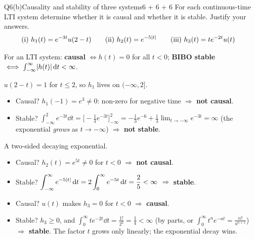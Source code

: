 \begin{qcard}{Q6(b)}{Causality and stability of three systems}{6 + 6 + 6}
For each continuous-time LTI system determine whether it is causal and whether it is stable. Justify your answers.
\[\text{(i) } h_1(t)=e^{-3t}u(2-t)\qquad\text{(ii) } h_2(t)=e^{-5\lvert t\rvert}\qquad\text{(iii) } h_3(t)=te^{-2t}u(t)\]
\end{qcard}
\begin{solution}
\begin{keyidea}For an LTI system: \textbf{causal} $\iff h(t)=0$ for all $t<0$; \textbf{BIBO stable} $\iff\int_{-\infty}^{\infty}\lvert h(t)\rvert\,\mathrm{d} t<\infty$.\end{keyidea}

 $u(2-t)=1$ for $t\le2$, so $h_1$ lives on $(-\infty,2]$.
\begin{itemize}[leftmargin=1.4em,itemsep=2pt]
\item Causal? $h_1(-1)=e^{3}\ne0$: non-zero for negative time $\Rightarrow$ \textbf{not causal}.
\item Stable? $\displaystyle\int_{-\infty}^{2}e^{-3t}\dd t=\Big[-\tfrac13e^{-3t}\Big]_{-\infty}^{2}=-\tfrac13e^{-6}+\tfrac13\lim_{t\to-\infty}e^{-3t}=\infty$ (the exponential \emph{grows} as $t\to-\infty$) $\Rightarrow$ \textbf{not stable}.
\end{itemize}
 A two-sided decaying exponential.
\begin{itemize}[leftmargin=1.4em,itemsep=2pt]
\item Causal? $h_2(t)=e^{5t}\ne0$ for $t<0$ $\Rightarrow$ \textbf{not causal}.
\item Stable? $\displaystyle\int_{-\infty}^\infty e^{-5\lvert t\rvert}\,\mathrm{d} t=2\int_0^\infty e^{-5t}\,\mathrm{d} t=\frac25<\infty$ $\Rightarrow$ \textbf{stable}.
\end{itemize}
\begin{itemize}[leftmargin=1.4em,itemsep=2pt]
\item Causal? $u(t)$ makes $h_3=0$ for $t<0$ $\Rightarrow$ \textbf{causal}.
\item Stable? $h_3\ge0$, and $\displaystyle\int_0^\infty te^{-2t}\dd t=\frac{1!}{2^2}=\frac14<\infty$ (by parts, or $\int_0^\infty t^ne^{-at}=\frac{n!}{a^{n+1}}$) $\Rightarrow$ \textbf{stable}. The factor $t$ grows only linearly; the exponential decay wins.
\end{itemize}
\begin{center}

\end{center}
\end{solution}
